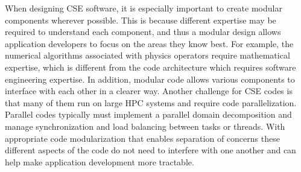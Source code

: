 
When designing CSE software, it is especially important to create
modular components wherever possible.  This is because different expertise may be required to understand
each component, and thus a modular design allows application
developers to focus on the areas they know best. For example, the
numerical algorithms associated with physics operators require mathematical expertise, which is
different from the code architecture which requires software
engineering expertise. In addition, modular code allows various
components to interface with each other in a clearer way.  Another
challenge for CSE codes is that many of them run on large HPC systems
and require code parallelization.  Parallel codes typically must
implement a parallel domain decomposition and manage synchronization
and load balancing between tasks or threads.  With appropriate code
modularization that enables separation of concerns these different
aspects of the code do not need to interfere with one another and can
help make application development more tractable. 


